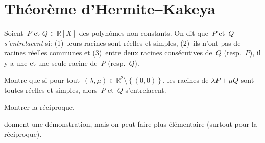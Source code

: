 
\section{Théorème d'Hermite--Kakeya}

Soient~$P$ et $Q \in \mathbb{R}[X]$ des polynômes non constants. On dit que~$P$
et~$Q$ \emph{s'entrelacent} si: (1)~leurs racines sont réelles et simples,
(2)~ils n'ont pas de racines réelles communes et (3)~entre deux racines
consécutives de~$Q$ (resp.~$P$), il y a une et une seule racine de~$P$
(resp.~$Q$).

Montre que si
pour tout~$(\lambda, \mu) \in \mathbb{R}^2 \setminus \left\{ (0,0) \right\}$,
les racines de $\lambda P + \mu Q$ sont toutes réelles et simples,
alors~$P$ et~$Q$ s'entrelacent.

Montrer la réciproque.

\begin{em}
  \textcite{RahmanSchmeisser_2002} donnent une démonstration, mais on peut faire plus élémentaire (surtout pour la réciproque).
\end{em}

